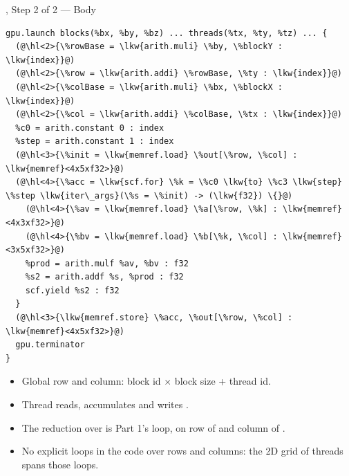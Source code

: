 \documentclass[aspectratio=169,10pt]{beamer}
\begin{document}
\begin{frame}[fragile]{, Step 2 of 2 --- Body}
\begin{lstlisting}[language=mlir,basicstyle=\ttfamily\fontsize{6.4}{7.6}\selectfont]
gpu.launch blocks(%bx, %by, %bz) ... threads(%tx, %ty, %tz) ... {
  (@\hl<2>{\%rowBase = \lkw{arith.muli} \%by, \%blockY : \lkw{index}}@)
  (@\hl<2>{\%row = \lkw{arith.addi} \%rowBase, \%ty : \lkw{index}}@)
  (@\hl<2>{\%colBase = \lkw{arith.muli} \%bx, \%blockX : \lkw{index}}@)
  (@\hl<2>{\%col = \lkw{arith.addi} \%colBase, \%tx : \lkw{index}}@)
  %c0 = arith.constant 0 : index
  %step = arith.constant 1 : index
  (@\hl<3>{\%init = \lkw{memref.load} \%out[\%row, \%col] : \lkw{memref}<4x5xf32>}@)
  (@\hl<4>{\%acc = \lkw{scf.for} \%k = \%c0 \lkw{to} \%c3 \lkw{step} \%step \lkw{iter\_args}(\%s = \%init) -> (\lkw{f32}) \{}@)
    (@\hl<4>{\%av = \lkw{memref.load} \%a[\%row, \%k] : \lkw{memref}<4x3xf32>}@)
    (@\hl<4>{\%bv = \lkw{memref.load} \%b[\%k, \%col] : \lkw{memref}<3x5xf32>}@)
    %prod = arith.mulf %av, %bv : f32
    %s2 = arith.addf %s, %prod : f32
    scf.yield %s2 : f32
  }
  (@\hl<3>{\lkw{memref.store} \%acc, \%out[\%row, \%col] : \lkw{memref}<4x5xf32>}@)
  gpu.terminator
}
\end{lstlisting}
  \vspace{0.2em}
  \begin{itemize}
    \item<2-> Global row and column: block id $\times$ block size + thread id.
    \item<3-> Thread  reads, accumulates and writes
      .
    \item<4-> The reduction over  is Part 1's loop, on row 
      of  and column  of .
    \item<5-> No explicit loops in the code over rows and columns:
      \alert{the 2D grid of threads spans those loops}.
  \end{itemize}
\end{frame}
\end{document}
